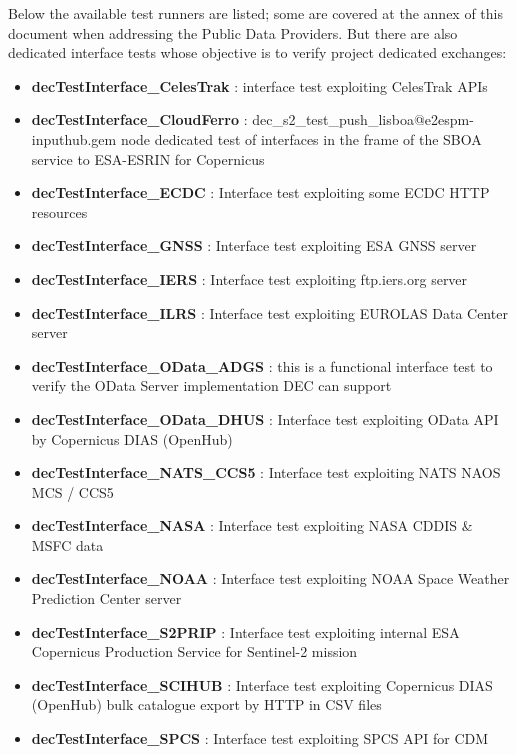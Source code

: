\documentclass[dec_sum_main.tex]{subfiles}
\begin{document}
\par
\noindent
Below the available test runners are listed; some are covered at the annex of this document when addressing the Public Data Providers. But there are also dedicated interface tests whose objective is to verify project dedicated exchanges:

\begin{itemize}
    \item \textbf{decTestInterface\_CelesTrak} : interface test exploiting CelesTrak APIs
     \item \textbf{decTestInterface\_CloudFerro} : dec\_s2\_test\_push\_lisboa@e2espm-inputhub.gem node dedicated test of interfaces in the frame of the SBOA service to ESA-ESRIN for Copernicus
     \item \textbf{decTestInterface\_ECDC} : Interface test exploiting some ECDC HTTP resources
     \item \textbf{decTestInterface\_GNSS} : Interface test exploiting ESA GNSS server
     \item \textbf{decTestInterface\_IERS} : Interface test exploiting ftp.iers.org  server
     \item \textbf{decTestInterface\_ILRS} : Interface test exploiting EUROLAS Data Center server
     \item \textbf{decTestInterface\_OData\_ADGS} : this is a functional interface test to verify the OData Server implementation DEC can support
     \item \textbf{decTestInterface\_OData\_DHUS} : Interface test exploiting OData API by Copernicus DIAS (OpenHub)
     \item \textbf{decTestInterface\_NATS\_CCS5} : Interface test exploiting NATS NAOS MCS / CCS5
     \item \textbf{decTestInterface\_NASA} : Interface test exploiting NASA CDDIS \& MSFC data
     \item \textbf{decTestInterface\_NOAA} : Interface test exploiting NOAA Space Weather Prediction Center server
     \item \textbf{decTestInterface\_S2PRIP} : Interface test exploiting internal ESA Copernicus Production Service for Sentinel-2 mission
     \item \textbf{decTestInterface\_SCIHUB} : Interface test exploiting Copernicus DIAS (OpenHub) bulk catalogue export by HTTP in CSV files
     \item \textbf{decTestInterface\_SPCS} : Interface test exploiting SPCS API for CDM     
\end{itemize}
\end{document}

